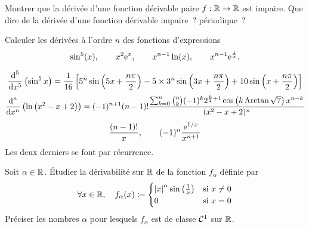 \documentclass{magnolia}
\begin{document}

\begin{questions}
\question Montrer que la dérivée d'une fonction dérivable paire $f:\mathbb{R}\to\mathbb{R}$ est impaire.
\question Que dire de la dérivée d'une fonction dérivable impaire~? périodique~?
\end{questions}


Calculer les dérivées à l'ordre $n$ des fonctions d'expressions
\[\sin^5(x), \qquad x^2{\rm e}^x, \qquad
  x^{n-1}\ln(x), \qquad x^{n-1}{\rm e}^{\frac{1}{x}}.\]
\begin{sol}
\[\frac{\text{d}^5}{\text{d}x^5}\left(\sin^5 x\right)=
  \frac{1}{16}\left[5^n\sin\left(5x+\frac{n\pi}{2}\right)
  -5\times 3^n\sin\left(3x+\frac{n\pi}{2}\right)+10\sin\left(x+\frac{n\pi}{2}\right)\right]\]
\[\frac{\text{d}^n}{\text{d}x^n}\left(\ln\left(x^2-x+2\right)\right)=
  (-1)^{n+1}(n-1)!\frac{\sum_{k=0}^n \binom{n}{k}(-1)^k
  2^{\frac{k}{2}+1}\cos\left(k\operatorname{Arctan}\sqrt{7}\right)x^{n-k}}{(x^2-x+2)^n}\]
\[\frac{(n-1)!}{x}, \qquad (-1)^n\frac{{\rm e}^{1/x}}{x^{n+1}}\]
Les deux derniers se font par récurrence.
\end{sol}



Soit $\alpha\in\mathbb{R}$. Étudier la dérivabilité sur $\mathbb{R}$ de la fonction $f_\alpha$
définie par
\[\forall x\in\mathbb{R} ,\quad f_\alpha(x)\coloneqq
  \begin{cases}
  \left|x\right|^\alpha \sin\left(\frac{1}{x}\right) & \text{si $x\neq 0$}\\
  0 & \text{si $x=0$}
  \end{cases}\]
Préciser les nombres $\alpha$ pour lesquels $f_\alpha$ est de classe
$\mathcal{C}^{1}$ sur $\mathbb{R}$.
\end{document}

